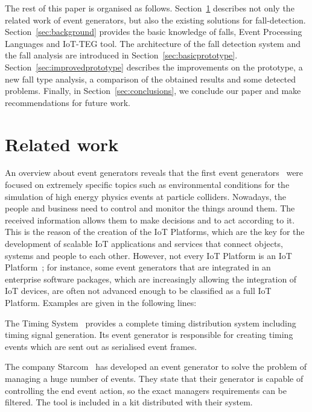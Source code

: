 \documentclass[conference]{IEEEtran}
\theoremstyle{definition}
\begin{document}
The rest of this paper is organised as follows. Section~\ref{sec:relatedwork}
describes not only the related work of event generators, but also the existing
solutions for fall-detection. Section~\ref{sec:background} provides the basic
knowledge of falls, Event Processing Languages and IoT-TEG tool. The architecture
of the fall detection system and the fall analysis are 
introduced in Section~\ref{sec:basicprototype}. Section~\ref{sec:improvedprototype}
describes the improvements on the prototype, a new fall type analysis,
a comparison of the obtained results and some detected problems. Finally, in Section~\ref{sec:conclusions}, 
we conclude our paper and make recommendations for future work.

\section{Related work}
\label{sec:relatedwork}

An overview about event generators reveals that the first event generators~\cite{dobbs2004houches,mangano2005tools} were focused on 
extremely specific topics such as environmental conditions for the simulation of high energy physics events at particle colliders. Nowadays,
the people and business need to control and monitor the things around them. The received information allows them
to make decisions and to act according to it. This is the reason of the creation of the IoT Platforms, which are the
key for the development of scalable IoT applications and services that connect objects, systems and people to each other.
However, not every IoT Platform is an IoT Platform~\cite{iot-analytics:2015}; for instance, some event generators that are integrated in an
enterprise software packages, which are increasingly allowing the integration of IoT devices, are often not advanced enough
to be classified as a full IoT Platform. Examples are given in the following lines:

The Timing System~\cite{Finland:2016} provides a complete timing distribution system including timing signal generation. Its event
generator is responsible for creating timing events which are sent out as serialised event frames.

The company Starcom~\cite{Starcom:2016} has developed an event generator to solve the problem of managing a huge number of
events. They state that their generator is capable of controlling the end event action, so the exact managers requirements can
be filtered. The tool is included in a kit distributed with their system.
\end{document}
